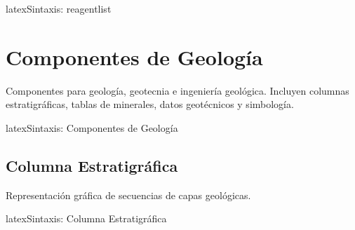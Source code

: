 
\begin{codigosimple}{latex}{Sintaxis: reagentlist}
\begin{reagentlist}
\end{reagentlist}
\end{codigosimple}

\begin{reagentlist}
\end{reagentlist}


\section{Componentes de Geología}
\label{sec:comp-geologia}

Componentes para geología, geotecnia e ingeniería geológica. Incluyen
columnas estratigráficas, tablas de minerales, datos geotécnicos y simbología.

\begin{codigosimple}{latex}{Sintaxis: Componentes de Geología}
\usepackage[geologia]{eps-componentes}
\end{codigosimple}

\subsection{Columna Estratigráfica}
\label{subsec:estratigrafia}

Representación gráfica de secuencias de capas geológicas.

\begin{codigosimple}{latex}{Sintaxis: Columna Estratigráfica}
\begin{stratigraphybox}[Título]
  \begin{stratcolumn}
  \end{stratcolumn}
\end{stratigraphybox}
\end{codigosimple}

\begin{stratigraphybox}
    \begin{stratcolumn}
    \end{stratcolumn}
\end{stratigraphybox}

